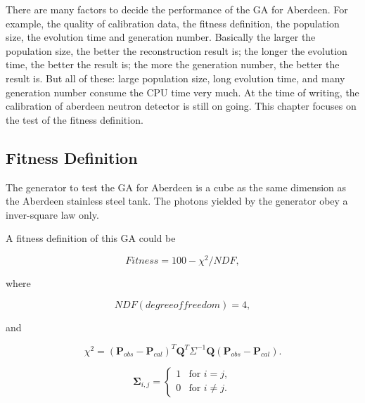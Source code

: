 There are many factors to decide the performance of the GA for Aberdeen.
For example, the quality of calibration data, the fitness definition,
the population size, the evolution time and generation number.
Basically the larger the population size, the better the reconstruction result is; the longer the evolution time, the better the result is;
the more the generation number, the better the result is. But all of these: large population size, long evolution time, and many generation
number consume the CPU time very much.
At the time of writing, the calibration of aberdeen neutron detector is still on going.
This chapter focuses on the test of the fitness definition.


\subsection{Fitness Definition}


The generator to test the GA for Aberdeen is a cube as the same dimension as the Aberdeen stainless steel tank.
The photons yielded by the generator obey a inver-square law only.

A fitness definition of this GA could be


\begin{equation}
\label{fitness}
Fitness = 100 - \chi^{2}/NDF,
\end{equation}


where


\begin{equation}
\label{eq:fitnessNDF}
NDF(degree of freedom) = 4,
\end{equation}


and


\begin{equation}
\label{eq:fitnessChi}
\chi^{2} = (\mathbf{P}_{obs} - \mathbf{P}_{cal})^T\mathbf{Q}^T\Sigma^{-1}\mathbf{Q}(\mathbf{P}_{obs} - \mathbf{P}_{cal}).
\end{equation}



\begin{equation}
\label{eq:covariance1}
\mathbf{\Sigma}_{i,j} =
\left\{
    \begin{array}{ll}
    1 & \mbox{for } i=j, \\
    0 & \mbox{for } i{\neq}j.
    \end{array} \right.
\end{equation}



